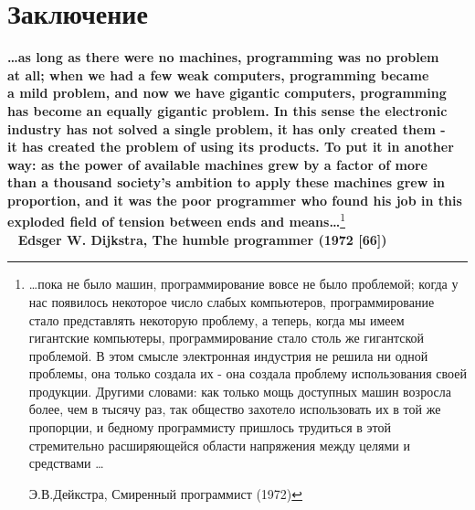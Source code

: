 \section{Заключение}

\begin{flushright} 
\textbf{\dots as long as there were no machines, programming was no problem \\ at all; when we had a few weak computers, programming became \\ a mild problem, and now we have gigantic computers, programming\\ has become an equally gigantic problem. In this sense the electronic\\ industry has not solved a single problem, it has only created them - \\ it has created the problem of using its products. To put it in another\\ way:  as the power of available machines grew by a factor of more\\ than a thousand society's ambition to apply these machines grew in\\ proportion, and it was the poor programmer who found his job in this\\ exploded field of tension between ends and means\dots}\footnote{\dots пока не было машин, программирование вовсе не было проблемой; когда у нас появилось некоторое число слабых компьютеров, программирование стало представлять некоторую проблему, а теперь, когда мы имеем гигантские компьютеры, программирование стало столь же гигантской проблемой. В этом смысле электронная индустрия не решила ни одной проблемы, она только создала их - она создала проблему использования своей продукции. Другими словами: как только мощь доступных машин возросла более, чем в тысячу раз, так общество захотело использовать их в той же пропорции, и бедному программисту пришлось трудиться в этой стремительно расширяющейся области напряжения между целями и средствами \dots

                                                                     Э.В.Дейкстра, Смиренный программист (1972)}
\\
\ \newline
\textbf{Edsger W. Dijkstra, The humble programmer (1972 [66])}
\end{flushright}

